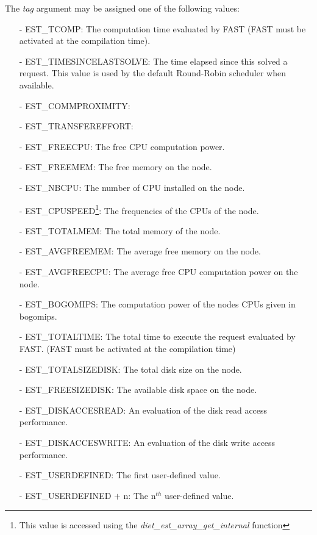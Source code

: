 \noindent The \textit{tag} argument may be assigned one of the following values:
\begin{itemize}
  \item[-] EST\_TCOMP: The computation time evaluated by FAST
    (FAST must be activated at the compilation time).
  \item[-] EST\_TIMESINCELASTSOLVE: The time elapsed since this {\sed} solved
    a request. This value is used by the default Round-Robin scheduler when
    available.
  \item[-] EST\_COMMPROXIMITY:
  \item[-] EST\_TRANSFEREFFORT:
  \item[-] EST\_FREECPU: The free CPU computation power.
  \item[-] EST\_FREEMEM: The free memory on the node.
  \item[-] EST\_NBCPU: The number of CPU installed on the node.
  \item[-] EST\_CPUSPEED\footnote{This value is accessed using the
      \textit{diet\_est\_array\_get\_internal} function}: The frequencies
    of the CPUs of the node.
  \item[-] EST\_TOTALMEM: The total memory of the node.
  \item[-] EST\_AVGFREEMEM: The average free memory on the node.
  \item[-] EST\_AVGFREECPU: The average free CPU computation power on the node.
  \item[-] EST\_BOGOMIPS\footnotemark[\value{footnote}]: The computation power
    of the nodes CPUs given in bogomips.
  \item[-] EST\_TOTALTIME: The total time to execute the request evaluated
    by FAST. (FAST must be activated at the compilation time)
  \item[-] EST\_TOTALSIZEDISK: The total disk size on the node.
  \item[-] EST\_FREESIZEDISK: The available disk space on the node.
  \item[-] EST\_DISKACCESREAD: An evaluation of the disk read access performance.
  \item[-] EST\_DISKACCESWRITE: An evaluation of the disk write access performance.
  \item[-] EST\_USERDEFINED: The first user-defined value.
  \item[-] EST\_USERDEFINED $+$ n: The n$^{th}$ user-defined value.
\end{itemize}

